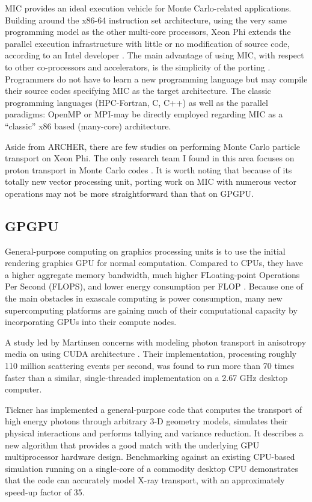 MIC provides an ideal execution vehicle for Monte Carlo-related applications. Building around the x86-64 instruction set architecture, using the very same programming model as the other multi-core processors, Xeon Phi extends the parallel execution infrastructure with little or no modification of source code, according to an Intel developer \citep{micdeveloper}. The main advantage of using MIC, with respect to other co-processors and accelerators, is the simplicity of the porting \citep{Bernaschi20142495}. Programmers do not have to learn a new programming language but may compile their source codes specifying MIC as the target architecture. The classic programming languages (HPC-Fortran, C, C++) as well as the parallel paradigms: OpenMP or MPI-may be directly employed regarding MIC as a “classic” x86 based (many-core) architecture.

Aside from ARCHER, there are few studies on performing Monte Carlo particle transport on Xeon Phi. The only research team I found in this area focuses on proton transport in Monte Carlo codes \citep{souris2014th, sterpin2014180}. It is worth noting that because of its totally new vector processing unit, porting work on MIC with numerous vector operations may not be more straightforward than that on GPGPU. 

\subsection{GPGPU}
General-purpose computing on graphics processing units is to use the initial rendering graphics GPU for normal computation. Compared to CPUs, they have a higher aggregate memory bandwidth, much higher FLoating-point Operations Per Second (FLOPS), and lower energy consumption per FLOP \citep{Reference2}. Because one of the main obstacles in exascale computing is power consumption, many new supercomputing platforms are gaining much of their computational capacity by incorporating GPUs into their compute nodes.

A study led by Martinsen concerns with modeling photon transport in anisotropy media on using CUDA architecture \citep{Reference1}. Their implementation, processing roughly 110 million scattering events per second, was found to run more than 70 times faster than a similar, single-threaded implementation on a 2.67 GHz desktop computer.

Tickner \citep{Reference3} has implemented a general-purpose code that computes the transport of high energy photons through arbitrary 3-D geometry models, simulates their physical interactions and performs tallying and variance reduction. It describes a new algorithm that provides a good match with the underlying GPU multiprocessor hardware design. Benchmarking against an existing CPU-based simulation running on a single-core of a commodity desktop CPU demonstrates that the code can accurately model X-ray transport, with an approximately speed-up factor of 35.


